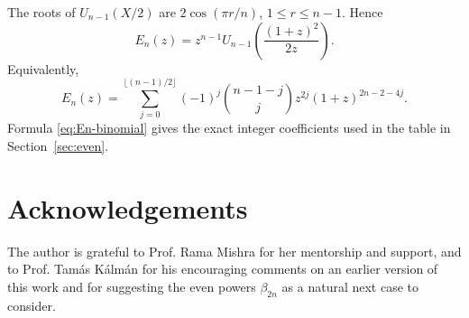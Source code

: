 \documentclass[11pt]{amsart}
\begin{document}
The roots of \(U_{n-1}(X/2)\) are \(2\cos(\pi r/n)\), \(1\le r\le n-1\).  Hence
\begin{equation}\label{eq:En-cheb}
        E_n(z)
        =z^{n-1}U_{n-1}\left(\frac{(1+z)^2}{2z}\right).
\end{equation}
Equivalently,
\begin{equation}\label{eq:En-binomial}
        E_n(z)
        =\sum_{j=0}^{\lfloor(n-1)/2\rfloor}
        (-1)^j\binom{n-1-j}{j}z^{2j}(1+z)^{2n-2-4j}.
\end{equation}
Formula \eqref{eq:En-binomial} gives the exact integer coefficients used in the table in Section~\ref{sec:even}.

\vspace{0.6cm}

\section*{Acknowledgements}
The author is grateful to Prof. Rama Mishra for her mentorship and support, and to Prof. Tamás Kálmán for his encouraging comments on an earlier version of this work and for suggesting the even powers \(\beta_{2n}\) as a natural next case to consider.




\end{document}
